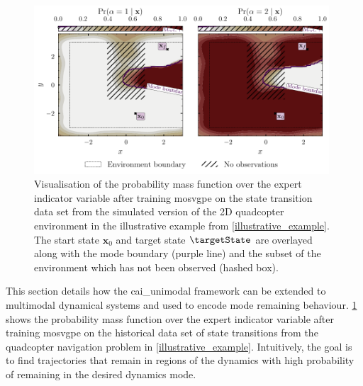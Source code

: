 \documentclass{mimosis-class/mimosis}
\numberwithin{equation}{chapter}
\newcommand{\state}{\ensuremath{\mathbf{x}}}
\begin{document}
{\renewcommand{\transitionVarDistK}{\ensuremath{q(\state_{\timeInd+1} \mid \state_0, \modeVarTraj_{0:\timeInd})}}
\begin{figure}[t!]
\centering
\includegraphics[width=0.98\textwidth]{./images/mode-opt/env/scenario_7/mosvgpe/mixing_probs_no_obs.pdf}
\caption[\acrshort{mosvgpe}'s mixing probabilities after training on simulated quadcopter data set from Environment 1]{
Visualisation of the probability mass function over the expert indicator variable after training \acrshort{mosvgpe}
on the state transition data set from the simulated version of the 2D quadcopter environment
in the illustrative example from \cref{illustrative_example}.
The start state $\state_0$ and target state $\targetState$ are overlayed along with the mode boundary (purple line)
and the subset of the environment which has not been observed (hashed box).}
\label{eq-traj-opt-gating-network-prob-post-inf}
\end{figure}
This section details how the \acrfull{cai_unimodal} framework can be extended to multimodal dynamical systems and
used to encode mode remaining behaviour.
\cref{eq-traj-opt-gating-network-prob-post-inf} shows the probability mass function over the expert indicator variable
after training \acrshort{mosvgpe} on the historical data set of state transitions from the
quadcopter navigation problem in \cref{illustrative_example}.
Intuitively, the goal is to find trajectories that remain in regions of the dynamics with high probability of
remaining in the desired dynamics mode.

\begin{figure}[t!]
  \centering
   \resizebox{0.4\textwidth}{!}{
    \begin{tikzpicture}[
      pre/.style={<-,shorten <=0.4pt,>=stealth',semithick},
      post/.style={->,shorten >=0.4pt,>=stealth',semithick}
      ]
      \node[obs] (x1) {$\state_0$};
      \node[latent, right=of x1] (x2) {$\state_1$};
      \node[latent, right=of x2] (x3) {$\state_2$};
      \node[latent, right=of x3] (x4) {$\state_3$};


\end{tikzpicture}}
\end{figure}}
\end{document}
